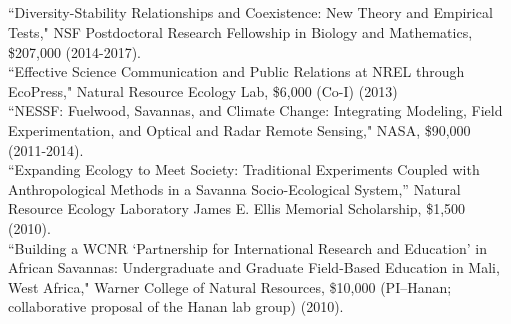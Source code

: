 \documentclass[margin,line]{resume}
\begin{document}
\begin{resume}
    \section{\textmd{\textsf{}}}
    ``Diversity-Stability Relationships and Coexistence: New Theory and Empirical Tests," NSF Postdoctoral Research Fellowship in Biology and Mathematics, \$207,000 (2014-2017).\vspace{2mm}\\%
    ``Effective Science Communication and Public Relations at NREL through EcoPress," Natural Resource Ecology Lab, \$6,000 (Co-I) (2013) \vspace{2mm}\\%
    ``NESSF: Fuelwood, Savannas, and Climate Change: Integrating Modeling, Field Experimentation, and Optical and Radar Remote Sensing," NASA, \$90,000 (2011-2014). \vspace{2mm}\\%
    ``Expanding Ecology to Meet Society: Traditional Experiments Coupled with Anthropological Methods in a Savanna Socio-Ecological System,'' Natural Resource Ecology Laboratory James E. Ellis Memorial Scholarship, \$1,500 (2010).\vspace{2mm}\\%
    ``Building a WCNR `Partnership for International Research and Education' in African Savannas: Undergraduate and Graduate Field-Based Education in Mali, West Africa," Warner College of Natural Resources, \$10,000 (PI--Hanan; collaborative proposal of the Hanan lab group) (2010).%
    

\end{resume}
\end{document}
